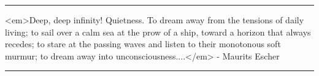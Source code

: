\par\noindent\rule{\textwidth}{0.4pt}
<em>Deep, deep infinity!  Quietness.  To dream away from the tensions
of daily living; to sail over a calm sea at the prow of a ship, toward
a horizon that always recedes; to stare at the passing waves and listen
to their monotonous soft murmur; to dream away into unconsciousness....</em> 
- Maurits Escher

\par\noindent\rule{\textwidth}{0.4pt}

